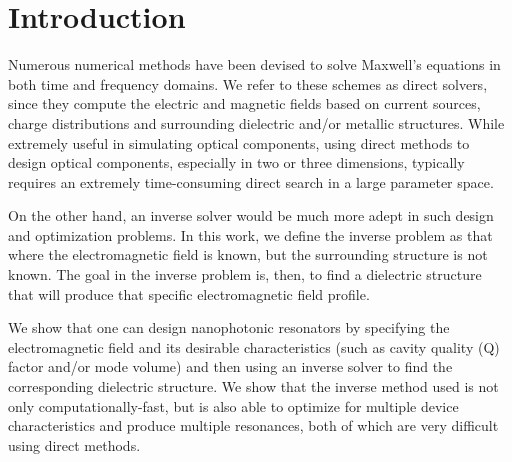 \documentclass[10pt,letterpaper]{article}
\begin{document}
\section{Introduction}
Numerous numerical methods have been devised to solve Maxwell's equations in both time\cite{Yee66} and frequency\cite{AB74,GA79} domains. We refer to these schemes as direct solvers, since they compute the electric and magnetic fields based on current sources, charge distributions and surrounding dielectric and/or metallic structures. While extremely useful in simulating optical components, using direct methods to design optical components, especially in two or three dimensions,  typically requires an extremely time-consuming direct search in a large parameter space\cite{Lon09,Sch02,Nod05,Lip08,SD05}.

On the other hand, an inverse solver would be much more adept in such design and optimization problems\cite{Sig04,Vuc05}. In this work, we define the inverse problem as that where the electromagnetic field is known, but the surrounding structure is not known. The goal in the inverse problem is, then, to find a dielectric structure that will produce that specific electromagnetic field profile.

We show that one can design nanophotonic resonators by specifying the electromagnetic field and its desirable characteristics (such as cavity quality (Q) factor and/or mode volume) and then using an inverse solver to find the corresponding dielectric structure. We show that the inverse method used is not only computationally-fast, but is also able to optimize for multiple device characteristics and produce multiple resonances, both of which are very difficult using direct methods. 
\end{document}
